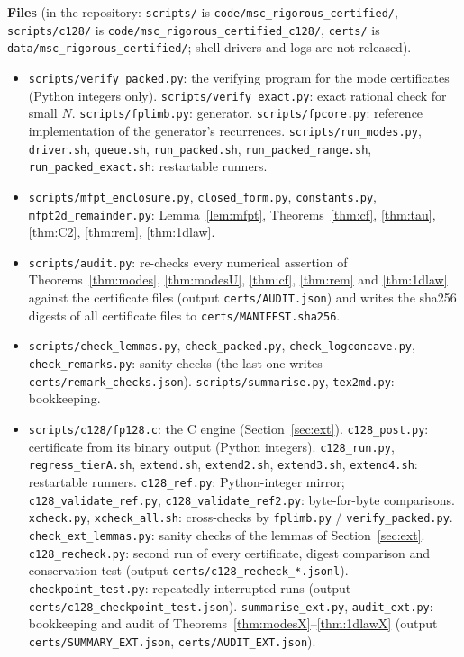 \documentclass[11pt,a4paper]{article}
\theoremstyle{definition}
\theoremstyle{remark}
\begin{document}
\textbf{Files} (in the repository: \texttt{scripts/} is \texttt{code/msc\_rigorous\_certified/}, \texttt{scripts/c128/} is \texttt{code/msc\_rigorous\_certified\_c128/}, \texttt{certs/} is \texttt{data/msc\_rigorous\_certified/}; shell drivers and logs are not released).
\begin{itemize}
\item \texttt{scripts/verify\_packed.py}: the verifying program for the mode certificates (Python integers only). \texttt{scripts/verify\_exact.py}: exact rational check for small $N$. \texttt{scripts/fplimb.py}: generator. \texttt{scripts/fpcore.py}: reference implementation of the generator's recurrences. \texttt{scripts/run\_modes.py}, \texttt{driver.sh}, \texttt{queue.sh}, \texttt{run\_packed.sh}, \texttt{run\_packed\_range.sh}, \texttt{run\_packed\_exact.sh}: restartable runners.
\item \texttt{scripts/mfpt\_enclosure.py}, \texttt{closed\_form.py}, \texttt{constants.py}, \texttt{mfpt2d\_remainder.py}: Lemma~\ref{lem:mfpt}, Theorems~\ref{thm:cf}, \ref{thm:tau}, \ref{thm:C2}, \ref{thm:rem}, \ref{thm:1dlaw}.
\item \texttt{scripts/audit.py}: re-checks every numerical assertion of Theorems~\ref{thm:modes}, \ref{thm:modesU}, \ref{thm:cf}, \ref{thm:rem} and \ref{thm:1dlaw} against the certificate files (output \texttt{certs/AUDIT.json}) and writes the sha256 digests of all certificate files to \texttt{certs/MANIFEST.sha256}.
\item \texttt{scripts/check\_lemmas.py}, \texttt{check\_packed.py}, \texttt{check\_logconcave.py}, \texttt{check\_remarks.py}: sanity checks (the last one writes \texttt{certs/remark\_checks.json}). \texttt{scripts/summarise.py}, \texttt{tex2md.py}: bookkeeping.
\item \texttt{scripts/c128/fp128.c}: the C engine (Section~\ref{sec:ext}). \texttt{c128\_post.py}: certificate from its binary output (Python integers). \texttt{c128\_run.py}, \texttt{regress\_tierA.sh}, \texttt{extend.sh}, \texttt{extend2.sh}, \texttt{extend3.sh}, \texttt{extend4.sh}: restartable runners. \texttt{c128\_ref.py}: Python-integer mirror; \texttt{c128\_validate\_ref.py}, \texttt{c128\_validate\_ref2.py}: byte-for-byte comparisons. \texttt{xcheck.py}, \texttt{xcheck\_all.sh}: cross-checks by \texttt{fplimb.py} / \texttt{verify\_packed.py}. \texttt{check\_ext\_lemmas.py}: sanity checks of the lemmas of Section~\ref{sec:ext}. \texttt{c128\_recheck.py}: second run of every certificate, digest comparison and conservation test (output \texttt{certs/c128\_recheck\_*.jsonl}). \texttt{checkpoint\_test.py}: repeatedly interrupted runs (output \texttt{certs/c128\_checkpoint\_test.json}). \texttt{summarise\_ext.py}, \texttt{audit\_ext.py}: bookkeeping and audit of Theorems~\ref{thm:modesX}--\ref{thm:1dlawX} (output \texttt{certs/SUMMARY\_EXT.json}, \texttt{certs/AUDIT\_EXT.json}).

\end{itemize}
\end{document}
